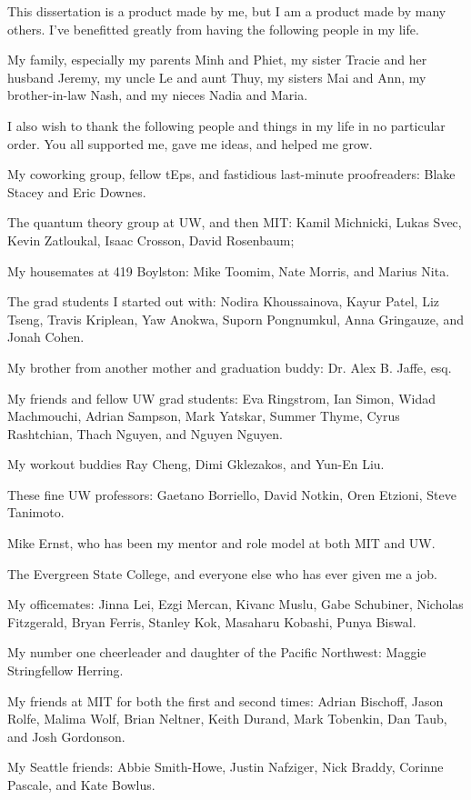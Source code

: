 This dissertation is a product made by me, but I am a product made by many others.
I've benefitted greatly from having the following people in my life.

My family, especially my parents Minh and Phiet, my sister Tracie and her husband Jeremy,
my uncle Le and aunt Thuy, my sisters Mai and Ann, my brother-in-law Nash,
and my nieces Nadia and Maria.

I also wish to thank the following people and things in my life in no particular order.
You all supported me, gave me ideas, and helped me grow.

My coworking group, fellow tEps, and fastidious last-minute proofreaders: Blake Stacey and Eric Downes.

The quantum theory group at UW, and then MIT: Kamil Michnicki, Lukas Svec, Kevin Zatloukal, Isaac Crosson, David Rosenbaum;

My housemates at 419 Boylston: Mike Toomim, Nate Morris, and Marius Nita.

The grad students I started out with: Nodira Khoussainova, Kayur Patel, Liz Tseng, Travis Kriplean, Yaw Anokwa, Suporn Pongnumkul, Anna Gringauze, and Jonah Cohen.

My brother from another mother and graduation buddy: Dr. Alex B. Jaffe, esq.

My friends and fellow UW grad students: Eva Ringstrom, Ian Simon, Widad Machmouchi, Adrian Sampson, Mark Yatskar, Summer Thyme, Cyrus Rashtchian, Thach Nguyen, and Nguyen Nguyen.

My workout buddies Ray Cheng, Dimi Gklezakos, and Yun-En Liu.

These fine UW professors: Gaetano Borriello, David Notkin, Oren Etzioni, Steve Tanimoto.

Mike Ernst, who has been my mentor and role model at both MIT and UW.

The Evergreen State College, and everyone else who has ever given me a job.

My officemates: Jinna Lei, Ezgi Mercan, Kivanc Muslu, Gabe Schubiner,
Nicholas Fitzgerald, Bryan Ferris, Stanley Kok, Masaharu Kobashi,
Punya Biswal.

My number one cheerleader and daughter of the Pacific Northwest: Maggie Stringfellow Herring.

My friends at MIT for both the first and second times:
Adrian Bischoff, Jason Rolfe,
Malima Wolf, Brian Neltner, Keith Durand, Mark Tobenkin, Dan Taub, and
Josh Gordonson.

My Seattle friends: Abbie Smith-Howe, Justin Nafziger, Nick Braddy, Corinne Pascale, and Kate Bowlus.

